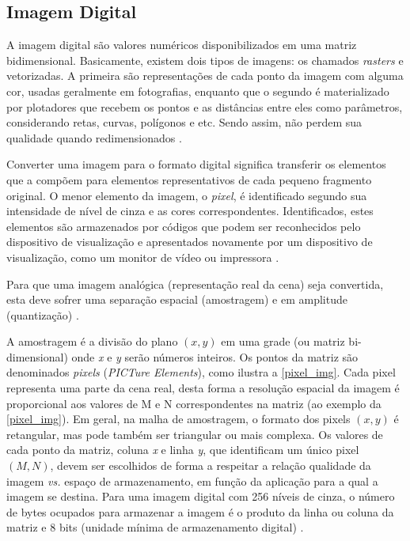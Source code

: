 \subsection{Imagem Digital}\label{subsec:imagem}

A imagem digital são valores numéricos disponibilizados em uma matriz bidimensional. Basicamente, existem dois tipos de imagens: os chamados \textit{rasters} e vetorizadas. A primeira são representações de cada ponto da imagem com alguma cor, usadas geralmente em fotografias, enquanto que o segundo é materializado por plotadores que recebem os pontos e as distâncias entre eles como parâmetros, considerando retas, curvas, polígonos e etc. Sendo assim, não perdem sua qualidade quando redimensionados \cite{img-digital-willians}.

Converter uma imagem para o formato digital significa transferir os elementos que a compõem para elementos representativos de cada pequeno fragmento original. O menor elemento da imagem, o \textit{pixel}, é identificado segundo sua intensidade de nível de cinza e as cores correspondentes. Identificados, estes elementos são armazenados por códigos que podem ser reconhecidos pelo dispositivo de visualização e apresentados novamente por um dispositivo de visualização, como um monitor de vídeo ou impressora \cite{img-digital-willians}. 



Para que uma imagem analógica (representação real da cena) seja convertida, esta deve sofrer uma separação espacial (amostragem) e em amplitude (quantização) \cite{img-digital-willians}. 

A amostragem é a divisão do plano $(x,y)$ em uma grade (ou matriz bi-dimensional) onde \textit{x} e \textit{y} serão números inteiros. Os pontos da matriz são denominados \textit{pixels} (\textit{PICTure Elements}), como ilustra a \autoref{pixel_img}. Cada pixel representa uma parte da cena real, desta forma a resolução espacial da imagem é proporcional aos valores de M e N correspondentes na matriz (ao exemplo da \autoref{pixel_img}). Em geral, na malha de amostragem, o formato dos pixels $(x,y)$ é retangular, mas pode também ser triangular ou mais complexa. Os valores de cada ponto da matriz, coluna \textit{x} e linha \textit{y}, que identificam um único pixel $(M,N)$, devem ser escolhidos de forma a respeitar a relação qualidade da imagem \textit{vs.} espaço de armazenamento, em função da aplicação para a qual a imagem se destina. Para uma imagem digital com 256 níveis de cinza, o número de bytes ocupados para armazenar a imagem é o produto da linha ou coluna da matriz e 8 bits (unidade mínima de armazenamento digital) \cite{img-digital-willians}. 

